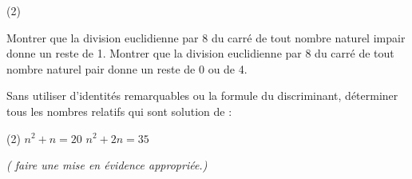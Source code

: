 \begin{exstheorie}
\medskip
\begin{tasks}[after-item-skip=2mm,before-skip=0mm,debug=false](2)%
\end{tasks}




\eexo
\pagebreak[3]





\exo
\leavevmode\vspace{-\dimexpr\baselineskip+\topsep-2mm}%
\begin{tasks}[after-item-skip=2mm,before-skip=0mm,debug=false]%
\task Montrer que la division euclidienne par 8 du carré de tout nombre naturel impair donne un reste de 1.
\task Montrer que la division euclidienne par 8 du carré de tout nombre naturel pair donne un reste de 0 ou de 4.
\end{tasks}

\vspace{-2mm}






\eexo
\pagebreak[3]





\exo
Sans utiliser d'identités remarquables ou la formule du discriminant, déterminer tous les nombres relatifs qui sont solution de :

\medskip
\begin{tasks}[after-item-skip=2mm,before-skip=0mm,debug=false](2)%
\task $n^2+n=20$
\task $n^2+2n=35$
\end{tasks}
{\footnotesize \textsl{( faire une mise en évidence appropriée.)}}






\eexo
\pagebreak[3]






\end{exstheorie}
